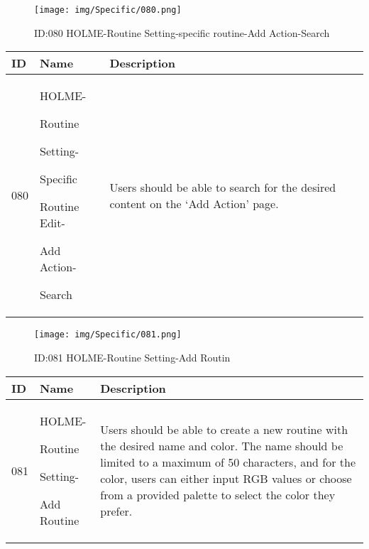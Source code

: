 \documentclass[conference]{IEEEtran}
\begin{document}
\begin{enumerate}
\begin{figure}[h]
\centering                                         
\texttt{[image: img/Specific/080.png]}
\caption{ID:080 HOLME-Routine Setting-specific routine-Add Action-Search}
\end{figure}
\begin{table}[h]
\def\arraystretch{1.2} \small
    \begin{tabular}{|p{1cm}|p{1.8cm}|p{5.0cm}|}
        \hline
        ID & Name & Description\\ \hline
         080 \par  & HOLME-\par Routine \par Setting- \par Specific  \par Routine Edit- \par Add Action- \par Search & 
         Users should be able to search for the desired content on the `Add Action' page.
         \\ \hline
    \end{tabular}
\end{table}
\clearpage

\begin{figure}[h]
\centering                                         
\texttt{[image: img/Specific/081.png]}
\caption{ID:081 HOLME-Routine Setting-Add Routin}
\end{figure}
\begin{table}[h]
\def\arraystretch{1.2} \small
    \begin{tabular}{|p{1cm}|p{1.8cm}|p{5.0cm}|}
        \hline
        ID & Name & Description\\ \hline
         081 \par  & HOLME-\par Routine \par Setting- \par Add Routine & 
Users should be able to create a new routine with the desired name and color. The name should be limited to a maximum of 50 characters, and for the color, users can either input RGB values or choose from a provided palette to select the color they prefer.
         \\ \hline
    \end{tabular}
\end{table}
\vspace{3cm}


\end{enumerate}
\end{document}
